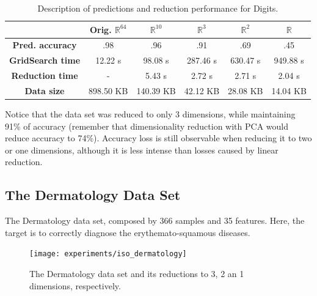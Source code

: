 \begin{table}[H]
	\centering
	\begin{tabular}{|c|c|c|c|c|c|}
		\hline
		& \textbf{Orig. $\mathbb{R}^{64}$} & \textbf{$\mathbb{R}^{10}$} & \textbf{$\mathbb{R}^3$} & \textbf{$\mathbb{R}^2$} & \textbf{$\mathbb{R}$} \\\hline
		\textbf{Pred. accuracy}   & .98 & .96 & .91 & .69 & .45 \\\hline
		\textbf{GridSearch time} & 12.22 s & 98.08 s & 287.46 s & 630.47 s & 949.88 s \\\hline
		\textbf{Reduction time}  & - & 5.43 s & 2.72 s & 2.71 s & 2.04 s \\\hline
		\textbf{Data size} & 898.50 KB & 140.39 KB & 42.12 KB & 28.08 KB & 14.04 KB \\\hline
	\end{tabular}
	
	\caption{Description of predictions and reduction performance for Digits.}
\end{table}

Notice that the data set was reduced to only 3 dimensions, while maintaining 91\% of accuracy (remember that dimensionality reduction with PCA would reduce accuracy to 74\%). Accuracy loss is still observable when reducing it to two or one dimensions, although it is less intense than losses caused by linear reduction.

\newpage
\subsection{The Dermatology Data Set}

The Dermatology data set, composed by 366 samples and 35 features. Here, the target is to correctly diagnose the erythemato-squamous diseases.

\begin{figure}[H]
	\centering
	\texttt{[image: experiments/iso\_dermatology]}
	\captionsetup{justification=centering}
	\caption{The Dermatology data set and its reductions to 3, 2 an 1 dimensions, respectively.}
\end{figure}

